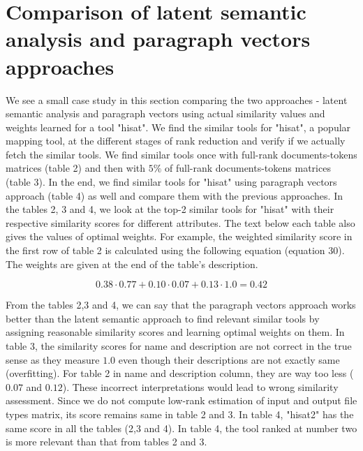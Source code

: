 \section{Comparison of latent semantic analysis and paragraph vectors approaches}
We see a small case study in this section comparing the two approaches - latent semantic analysis and paragraph vectors using actual similarity values and weights learned for a tool "hisat". We find the similar tools for "hisat", a popular mapping tool, at the different stages of rank reduction and verify if we actually fetch the similar tools. We find similar tools once with full-rank documents-tokens matrices (table 2) and then with $5\%$ of full-rank documents-tokens matrices (table 3). In the end, we find similar tools for "hisat" using paragraph vectors approach (table 4) as well and compare them with the previous approaches. In the tables 2, 3 and 4, we look at the top-2 similar tools for "hisat" with their respective similarity scores for different attributes. The text below each table also gives the values of optimal weights. For example, the weighted similarity score in the first row of table 2 is calculated using the following equation (equation 30). The weights are given at the end of the table's description.

\begin{equation}
0.38 \cdot 0.77 + 0.10 \cdot 0.07 + 0.13 \cdot 1.0 = 0.42
\end{equation}

From the tables 2,3 and 4, we can say that the paragraph vectors approach works better than the latent semantic approach to find relevant similar tools by assigning reasonable similarity scores and learning optimal weights on them. In table 3, the similarity scores for name and description are not correct in the true sense as they measure $1.0$ even though their descriptions are not exactly same (overfitting). For table 2 in name and description column, they are way too less ($0.07$ and $0.12$). These incorrect interpretations would lead to wrong similarity assessment. Since we do not compute low-rank estimation of input and output file types matrix, its score remains same in table 2 and 3. In table 4, "hisat2" has the same score in all the tables (2,3 and 4). In table 4, the tool ranked at number two is more relevant than that from tables 2 and 3.

